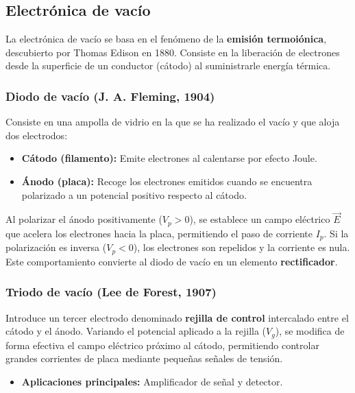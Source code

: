 \subsection{Electrónica de vacío}

La electrónica de vacío se basa en el fenómeno de la \textbf{emisión termoiónica}, descubierto por Thomas Edison en 1880. Consiste en la liberación de electrones desde la superficie de un conductor (cátodo) al suministrarle energía térmica.

\subsubsection{Diodo de vacío (J. A. Fleming, 1904)}
Consiste en una ampolla de vidrio en la que se ha realizado el vacío y que aloja dos electrodos:
\begin{itemize}
    \item \textbf{Cátodo (filamento):} Emite electrones al calentarse por efecto Joule.
    \item \textbf{Ánodo (placa):} Recoge los electrones emitidos cuando se encuentra polarizado a un potencial positivo respecto al cátodo.
\end{itemize}

\begin{concepto}
Al polarizar el ánodo positivamente ($V_p > 0$), se establece un campo eléctrico $\vec{E}$ que acelera los electrones hacia la placa, permitiendo el paso de corriente $I_p$. Si la polarización es inversa ($V_p < 0$), los electrones son repelidos y la corriente es nula. Este comportamiento convierte al diodo de vacío en un elemento \textbf{rectificador}.
\end{concepto}

\subsubsection{Triodo de vacío (Lee de Forest, 1907)}
Introduce un tercer electrodo denominado \textbf{rejilla de control} intercalado entre el cátodo y el ánodo. Variando el potencial aplicado a la rejilla ($V_g$), se modifica de forma efectiva el campo eléctrico próximo al cátodo, permitiendo controlar grandes corrientes de placa mediante pequeñas señales de tensión. 
\begin{itemize}
    \item \textbf{Aplicaciones principales:} Amplificador de señal y detector.
\end{itemize}

